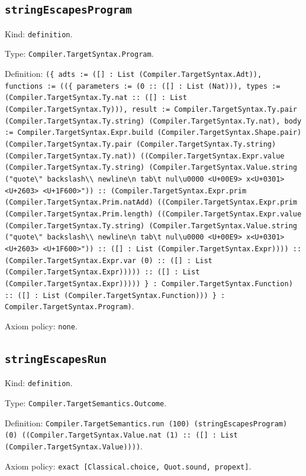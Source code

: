 \documentclass[11pt]{article}
\begin{document}
\subsection*{\texttt{stringEscapesProgram}}
\noindent Kind: \texttt{definition}.\par
\noindent Type: \texttt{Compiler.TargetSyntax.Program}.\par
\noindent Definition: \texttt{(\{ adts := ([] : List (Compiler.TargetSyntax.Adt)), functions := ((\{ parameters := (0 :: ([] : List (Nat))), types := (Compiler.TargetSyntax.Ty.nat :: ([] : List (Compiler.TargetSyntax.Ty))), result := Compiler.TargetSyntax.Ty.pair (Compiler.TargetSyntax.Ty.string) (Compiler.TargetSyntax.Ty.nat), body := Compiler.TargetSyntax.Expr.build (Compiler.TargetSyntax.Shape.pair) (Compiler.TargetSyntax.Ty.pair (Compiler.TargetSyntax.Ty.string) (Compiler.TargetSyntax.Ty.nat)) ((Compiler.TargetSyntax.Expr.value (Compiler.TargetSyntax.Ty.string) (Compiler.TargetSyntax.Value.string ("quote\textbackslash{}" backslash\textbackslash{}\textbackslash{} newline\textbackslash{}n tab\textbackslash{}t nul\textbackslash{}u0000 <U+00E9> x<U+0301> <U+2603> <U+1F600>")) :: (Compiler.TargetSyntax.Expr.prim (Compiler.TargetSyntax.Prim.natAdd) ((Compiler.TargetSyntax.Expr.prim (Compiler.TargetSyntax.Prim.length) ((Compiler.TargetSyntax.Expr.value (Compiler.TargetSyntax.Ty.string) (Compiler.TargetSyntax.Value.string ("quote\textbackslash{}" backslash\textbackslash{}\textbackslash{} newline\textbackslash{}n tab\textbackslash{}t nul\textbackslash{}u0000 <U+00E9> x<U+0301> <U+2603> <U+1F600>")) :: ([] : List (Compiler.TargetSyntax.Expr)))) :: (Compiler.TargetSyntax.Expr.var (0) :: ([] : List (Compiler.TargetSyntax.Expr))))) :: ([] : List (Compiler.TargetSyntax.Expr))))) \} : Compiler.TargetSyntax.Function) :: ([] : List (Compiler.TargetSyntax.Function))) \} : Compiler.TargetSyntax.Program)}.\par
\noindent Axiom policy: \texttt{none}.\par
\subsection*{\texttt{stringEscapesRun}}
\noindent Kind: \texttt{definition}.\par
\noindent Type: \texttt{Compiler.TargetSemantics.Outcome}.\par
\noindent Definition: \texttt{Compiler.TargetSemantics.run (100) (stringEscapesProgram) (0) ((Compiler.TargetSyntax.Value.nat (1) :: ([] : List (Compiler.TargetSyntax.Value))))}.\par
\noindent Axiom policy: \texttt{exact [Classical.choice, Quot.sound, propext]}.\par
\end{document}
